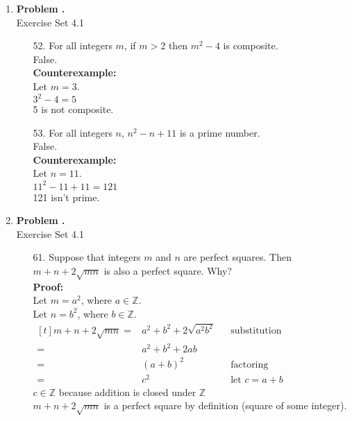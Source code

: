 \documentclass[letterpaper,fleqn]{article}
\begin{document}
	\newcommand{\set}[1]{Exercise Set 4.#1}
	
	\setcounter{pcount}{1}
	
	\newcommand{\problem}[2]{	
		\item [] 
		\textbf{Problem \thepcount\stepcounter{pcount}.} \\
		Exercise Set 4.#1
		\begin{enumerate}
			#2
		\end{enumerate}
	}
	
	\newcommand{\case}[2]{\cellcolor{yellow!25}\textbf{Case #1:} #2}
	\newcommand{\theorem}[2]{
		\cellcolor{green!25}\textbf{Theorem #1:} \\
		#2
	}
	
	\begin{enumerate}
		\problem{1}{
		\item [52.]
		For all integers $m$, if $m>2$ then $m^2-4$ is composite. \\
		False. \\
		\textbf{Counterexample:} \\
		Let $m=3$. \\
		$3^2-4=5$ \\
		5 is not composite.
		
		\item [53.]
		For all integers $n$, $n^2-n+11$ is a prime number. \\
		False. \\
		\textbf{Counterexample:} \\
		Let $n=11$. \\
		$11^2-11+11=121$ \\
		121 isn't prime.
		}
		
		\problem{1}{
		\item [61.]
		Suppose that integers $m$ and $n$ are perfect squares. Then $m+n+2\sqrt{mn}$ is also a perfect square. Why? \\
		\textbf{Proof:} \\
		Let $m=a^2$, where $a \in \mathbb{Z}$. \\
		Let $n=b^2$, where $b \in \mathbb{Z}$. \\
		$\begin{aligned}[t]
			m+n+2\sqrt{mn} ={} & a^2+b^2+2\sqrt{a^2b^2}  && \text{substitution} \\
			={} & a^2+b^2+2ab \\
			={} & (a+b)^2 && \text{factoring} \\
			={} & c^2 && \text{let $c=a+b$}
		\end{aligned}$ \\
		$c \in \mathbb{Z}$ because addition is closed under $\mathbb{Z}$ \\
		$m+n+2\sqrt{mn}$ is a perfect square by definition (square of some integer).
		}
		

\end{enumerate}
\end{document}

